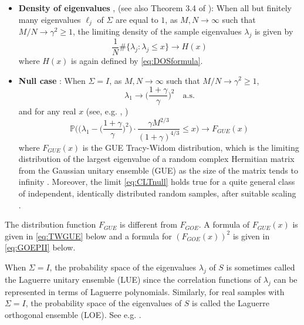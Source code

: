 \documentclass[11pt]{article}
\begin{document}
\begin{itemize}
\item \textbf{Density of eigenvalues} \cite{MP}, \cite{BaiSilverstein}
(see also Theorem 3.4 of \cite{BaiReview}): When all but finitely
many eigenvalues $\ell_j$ of $\Sigma$ are equal to $1$, as
$M,N\to\infty$ such that $M/N\to \gamma^2\ge 1$, the limiting
density of the sample eigenvalues $\lambda_j$ is given by
\begin{equation}\label{eq:DOS}
  \frac1{N} \#\{ \lambda_j : \lambda_j\le x\} \to H(x)
\end{equation}
where $H(x)$ is again defined by \eqref{eq:DOSformula}.
\item \textbf{Null case} : When $\Sigma=I$, as $M,N\to\infty$
such that $M/N\to \gamma^2\ge 1$, \cite{Geman}
\begin{equation}\label{eq:SL}
  \lambda_1 \to \biggl(\frac{1+\gamma}{\gamma}\biggr)^2 \quad \text{a.s.}
\end{equation}
and for any real $x$ (see, e.g. \cite{Forrester},
\cite{JohanssonOrthogonal})
\begin{equation}\label{eq:CLTnull}
  \mathbb{P} \biggl( \bigr( \lambda_1 - \bigl(\frac{1+\gamma}{\gamma}\bigr)^2 \bigr) \cdot
  \frac{\gamma M^{2/3}}{(1+\gamma)^{4/3}} \le x \biggr)
  \to F_{GUE}(x)
\end{equation}
where $F_{GUE}(x)$ is the GUE Tracy-Widom distribution, which is
the limiting distribution of the largest eigenvalue of a random
complex Hermitian matrix from the Gaussian unitary ensemble (GUE)
as the size of the matrix tends to infinity \cite{TracyWidom}.
Moreover, the limit \eqref{eq:CLTnull} holds true for a quite
general class of independent, identically distributed random
samples, after suitable scaling \cite{Soshnikovcovariance}.
\end{itemize}



\begin{remark}
The distribution function $F_{GUE}$ is different from $F_{GOE}$. A
formula of $F_{GUE}(x)$ is given in \eqref{eq:TWGUE} below and a
formula for $(F_{GOE}(x))^2$ is given in \eqref{eq:GOEPII} below.
\end{remark}

\begin{remark}
When $\Sigma=I$, the probability space of the eigenvalues
$\lambda_j$ of $S$ is sometimes called the Laguerre unitary
ensemble (LUE) since the correlation functions of $\lambda_j$ can
be represented in terms of Laguerre polynomials. Similarly, for
real samples with $\Sigma=I$, the probability space of the
eigenvalues of $S$ is called the Laguerre orthogonal ensemble
(LOE). See e.g. \cite{ForresterBook}.
\end{remark}
\end{document}
